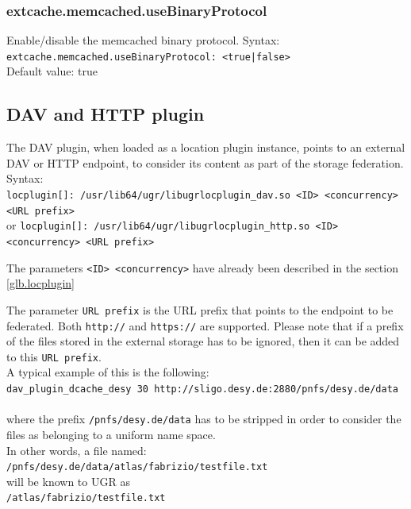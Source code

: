 \documentclass[12pt]{article} %
\begin{document}
\subsubsection{extcache.memcached.useBinaryProtocol}
Enable/disable the memcached binary protocol.
Syntax:\\
\verb"extcache.memcached.useBinaryProtocol: <true|false>"\\
Default value: true\\

\subsection{DAV and HTTP plugin}

The DAV plugin, when loaded as a location plugin instance, points to an external DAV or HTTP endpoint, to consider its content as part of the storage federation.\\

Syntax:\\
\verb"locplugin[]: /usr/lib64/ugr/libugrlocplugin_dav.so <ID> <concurrency> <URL prefix>"\\
or
\verb"locplugin[]: /usr/lib64/ugr/libugrlocplugin_http.so <ID> <concurrency> <URL prefix>"


The parameters \verb"<ID> <concurrency>" have already been described in the section \ref{glb.locplugin}

The parameter \verb"URL prefix" is the URL prefix that points to the endpoint to be federated. Both \verb"http://" and \verb"https://" are supported. Please note that if a prefix of the files stored in the external storage has to be ignored, then it can be added to this \verb"URL prefix". \\

A typical example of this is the following:\\
\verb"dav_plugin_dcache_desy 30 http://sligo.desy.de:2880/pnfs/desy.de/data"\\ \\

where the prefix \verb"/pnfs/desy.de/data" has to be stripped in order to consider the files as belonging to a uniform name space.\\

In other words, a file named:\\
\verb"/pnfs/desy.de/data/atlas/fabrizio/testfile.txt"\\

will be known to UGR as\\
\verb"/atlas/fabrizio/testfile.txt"\\
\end{document}
